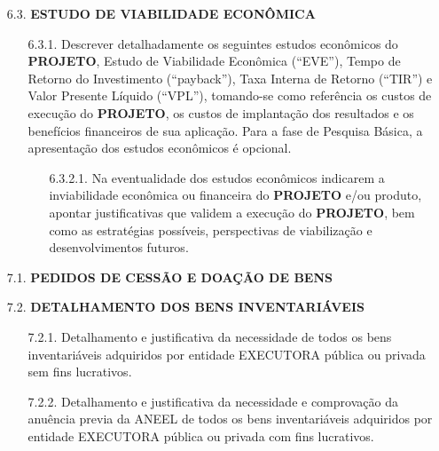 {\begin{lmarginbox}
\begin{enumerate}[leftmargin=1cm, font=\bfseries]
        \item[6.3.]	\textbf{ESTUDO DE VIABILIDADE ECONÔMICA}
            \begin{enumerate}[font=\bfseries]
                \item[6.3.1.]Descrever detalhadamente os seguintes estudos econômicos do \textbf{PROJETO}, Estudo de Viabilidade Econômica (“EVE”), Tempo de Retorno do Investimento (“payback”), Taxa Interna de Retorno (“TIR”) e Valor Presente Líquido (“VPL”), tomando-se como referência os custos de execução do \textbf{PROJETO}, os custos de implantação dos resultados e os benefícios financeiros de sua aplicação. Para a fase de Pesquisa Básica, a apresentação dos estudos econômicos é opcional.
                \begin{enumerate}[font=\bfseries]
                    \item[6.3.2.1.]	Na eventualidade dos estudos econômicos indicarem a inviabilidade econômica ou financeira do \textbf{PROJETO} e/ou produto, apontar justificativas que validem a execução do \textbf{PROJETO}, bem como as estratégias possíveis, perspectivas de viabilização e desenvolvimentos futuros.
                \end{enumerate}
            \end{enumerate}

        \item[7.1.] \textbf{PEDIDOS DE CESSÃO E DOAÇÃO DE BENS}

        \item[7.2.] \textbf{DETALHAMENTO DOS BENS INVENTARIÁVEIS}
            \begin{enumerate}[font=\bfseries]
                \item[7.2.1.] Detalhamento e justificativa da necessidade de todos os bens inventariáveis adquiridos por entidade EXECUTORA pública ou privada sem fins lucrativos.
                \item[7.2.2.] Detalhamento e justificativa da necessidade e comprovação da anuência previa da ANEEL de todos os bens inventariáveis adquiridos por entidade EXECUTORA pública ou privada com fins lucrativos.
            \end{enumerate}


\end{enumerate}
\end{lmarginbox}}
